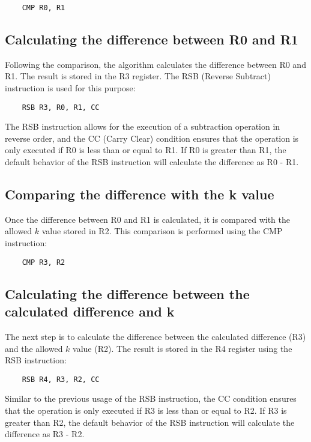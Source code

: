 \begin{verbatim}
    CMP R0, R1
\end{verbatim}

\subsection{Calculating the difference between R0 and R1}

Following the comparison, the algorithm calculates the difference between R0 and R1. The result is stored in the R3 register. The RSB (Reverse Subtract) instruction is used for this purpose:

\begin{verbatim}
    RSB R3, R0, R1, CC
\end{verbatim}

The RSB instruction allows for the execution of a subtraction operation in reverse order, and the CC (Carry Clear) condition ensures that the operation is only executed if R0 is less than or equal to R1. If R0 is greater than R1, the default behavior of the RSB instruction will calculate the difference as R0 - R1.

\subsection{Comparing the difference with the k value}

Once the difference between R0 and R1 is calculated, it is compared with the allowed $k$ value stored in R2. This comparison is performed using the CMP instruction:

\begin{verbatim}
    CMP R3, R2
\end{verbatim}

\subsection{Calculating the difference between the calculated difference and k}

The next step is to calculate the difference between the calculated difference (R3) and the allowed $k$ value (R2). The result is stored in the R4 register using the RSB instruction:

\begin{verbatim}
    RSB R4, R3, R2, CC
\end{verbatim}

Similar to the previous usage of the RSB instruction, the CC condition ensures that the operation is only executed if R3 is less than or equal to R2. If R3 is greater than R2, the default behavior of the RSB instruction will calculate the difference as R3 - R2.

